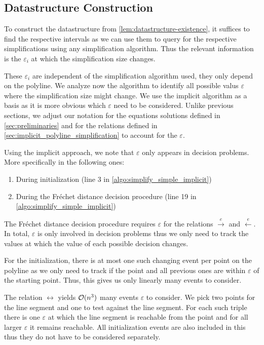 \subsection{Datastructure Construction}
\label{ssec:ds-construction}

To construct the datastructure from \cref{lem:datastructure-existence}, it suffices to find the respective intervals as we can use them to query for the respective simplifications using any simplification algorithm. Thus the relevant information is the \(\varepsilon_i\) at which the simplification size changes.

These \(\varepsilon_i\) are independent of the simplification algorithm used, they only depend on the polyline. We analyze now the \citeauthor{on_optimal_polyline_simplification_using_the_hausdorff_and_frechet_distance} algorithm to identify all possible valus \(\varepsilon\) where the simplification size might change. We use the implicit algorithm as a basis as it is more obvious which \(\varepsilon\) need to be considered. Unlike previous sections, we adjust our notation for the equations solutions defined in \cref{sec:preliminaries} and for the relations defined in \cref{sec:implicit_polyline_simplification} to account for the \(\varepsilon\).

Using the implicit approach, we note that \(\varepsilon\) only appears in decision problems. More specifically in the following ones:
\begin{enumerate}
  \item During initialization (line 3 in \cref{algo:simplify_simple_implicit})
	\item During the Fréchet distance decision procedure (line 19 in \cref{algo:simplify_simple_implicit})
\end{enumerate}

The Fréchet distance decision procedure requires \(\varepsilon\) for the relations \(\overset e\rightarrow\) and \(\overset e\leftarrow\). In total, \(\varepsilon\) is only involved in decision problems thus we only need to track the values at which the value of each possible decision changes. 

For the initialization, there is at most one such changing event per point on the polyline as we only need to track if the point and all previous ones are within \(\varepsilon\) of the starting point. Thus, this gives us only linearly many events to consider.

The relation \(\leftrightarrow\) yields \(\mathcal{O}(n^3)\) many events \(\varepsilon\) to consider. We pick two points for the line segment and one to test against the line segment. For each such triple there is one \(\varepsilon\) at which the line segment is reachable from the point and for all larger \(\varepsilon\) it remains reachable. All initialization events are also included in this thus they do not have to be considered separately.

